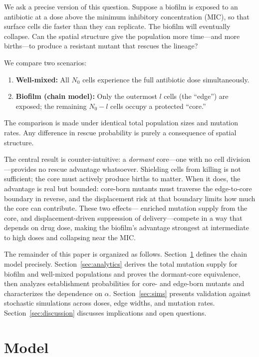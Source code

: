 \documentclass[12pt]{article}
\begin{document}
We ask a precise version of this question. Suppose a biofilm is exposed to an
antibiotic at a dose above the minimum inhibitory concentration (MIC), so that
surface cells die faster than they can replicate. The biofilm will eventually
collapse. Can the spatial structure give the population more time---and more
births---to produce a resistant mutant that rescues the lineage?

We compare two scenarios:
\begin{enumerate}
    \item \textbf{Well-mixed:} All $N_0$ cells experience the full antibiotic
        dose simultaneously.
    \item \textbf{Biofilm (chain model):} Only the outermost $l$ cells
        (the ``edge'') are exposed; the remaining $N_0 - l$ cells occupy a
        protected ``core.''
\end{enumerate}

The comparison is made under identical total population sizes and mutation
rates. Any difference in rescue probability is purely a consequence of spatial
structure.

The central result is counter-intuitive: a \emph{dormant} core---one with no
cell division---provides no rescue advantage whatsoever. Shielding cells from
killing is not sufficient; the core must actively produce births to matter.
When it does, the advantage is real but bounded: core-born mutants must
traverse the edge-to-core boundary in reverse, and the displacement risk at
that boundary limits how much the core can contribute. These two effects---
enriched mutation supply from the core, and displacement-driven suppression of
delivery---compete in a way that depends on drug dose, making the biofilm's
advantage strongest at intermediate to high doses and collapsing near the MIC.

The remainder of this paper is organized as follows.
Section~\ref{sec:model} defines the chain model precisely.
Section~\ref{sec:analytics} derives the total mutation supply for biofilm and
well-mixed populations and proves the dormant-core equivalence, then analyzes
establishment probabilities for core- and edge-born mutants and characterizes
the dependence on $\alpha$.
Section~\ref{sec:sims} presents validation against stochastic simulations
across doses, edge widths, and mutation rates.
Section~\ref{sec:discussion} discusses implications and open questions.

\section{Model}
\label{sec:model}
\end{document}
